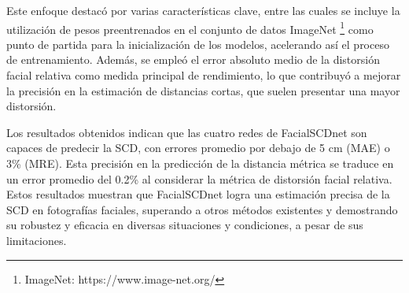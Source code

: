 Este enfoque destacó por varias características clave, entre las cuales se incluye la utilización de pesos preentrenados en el conjunto de datos ImageNet \footnote{ImageNet: https://www.image-net.org/} como punto de partida para la inicialización de los modelos, acelerando así el proceso de entrenamiento. Además, se empleó el error absoluto medio de la distorsión facial relativa como medida principal de rendimiento, lo que contribuyó a mejorar la precisión en la estimación de distancias cortas, que suelen presentar una mayor distorsión.

Los resultados obtenidos indican que las cuatro redes de FacialSCDnet son capaces de predecir la SCD, con errores promedio por debajo de 5 cm (MAE) o 3\% (MRE). Esta precisión en la predicción de la distancia métrica se traduce en un error promedio del 0.2\% al considerar la métrica de distorsión facial relativa. Estos resultados muestran que FacialSCDnet logra una estimación precisa de la SCD en fotografías faciales, superando a otros métodos existentes y demostrando su robustez y eficacia en diversas situaciones y condiciones, a pesar de sus limitaciones.